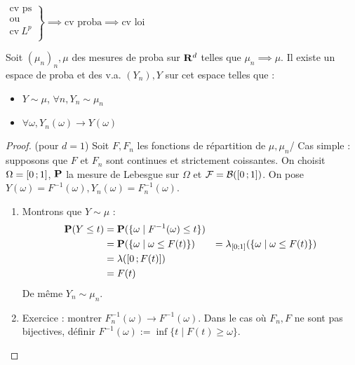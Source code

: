 	\begin{pop}
		$\left. \begin{array}{r}
			\text{cv ps} \\
			\text{ou} \\
			\text{cv}\ L^p \\
		\end{array}\right\} \implies
		\text{cv proba} \implies
		\text{cv loi}$
	\end{pop}

	\begin{thm}
		Soit $(\mu_n)_n, \mu$ des mesures de proba sur $\mathbf{R}^d$ telles que $\mu_n \implies \mu$.
		Il existe un espace de proba et des v.a. $(Y_n), Y$ sur cet espace telles que :
		\begin{itemize}
			\item[\textbullet] $Y \sim \mu$, $\forall n, Y_n \sim \mu_n$
			\item[\textbullet] $\forall \omega, Y_n(\omega) \longrightarrow Y(\omega)$
		\end{itemize}
	\end{thm}

	\begin{proof}(pour $d = 1$)
		Soit $F, F_n$ les fonctions de répartition de $\mu, \mu_n$/
		Cas simple : supposons que $F$ et $F_n$ sont continues et strictement coissantes.
		On choisit $\Omega = \mathopen{[}0\mathclose{}\mathpunct{};1\mathclose{]}$, $\mathbf{P}$ la mesure de Lebesgue sur $\Omega$ et $\mathcal{F} = \mathcal{B}(\mathopen{}\mathclose{\left[0\mathclose{}\mathpunct{};1\right]})$.
		On pose $Y(\omega) = F^{-1}(\omega), Y_n(\omega) = F_n^{-1}(\omega)$.
		\begin{enumerate}
			\item Montrons que $Y \sim \mu$ :
				\begin{align*}
				\mathbf{P}(Y \leq t) & = \mathbf{P}(\{ \omega \mid F^{-1}(\omega) \leq t \}) \\
				                 & = \mathbf{P}(\{ \omega \mid \omega \leq F(t) \})
				                 & = \lambda_{\mathopen{}\mathclose{\left[0\mathclose{}\mathpunct{};1\right]}}( \{ \omega \mid \omega \leq F(t) \} ) \\
				                 & = \lambda(\mathopen{}\mathclose{\left[0\mathclose{}\mathpunct{};F(t)\right]}) \\
				                 & = F(t)
				\end{align*}
				De même $Y_n \sim \mu_n$.
			\item Exercice : montrer $F_n^{-1}(\omega) \longrightarrow F^{-1}(\omega)$.
				Dans le cas où $F_n, F$ ne sont pas bijectives, définir $F^{-1}(\omega) := \inf \{ t \mid F(t) \geq \omega \}$.
		\end{enumerate}
	\end{proof}

